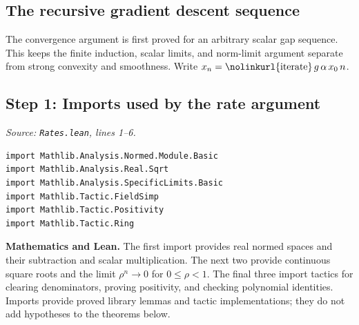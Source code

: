 \documentclass[11pt,a4paper]{article}
\newcommand{\lean}[1]{\ifmmode\text{\nolinkurl{#1}}\else\nolinkurl{#1}\fi}
\newenvironment{proofstep}{%
 \begin{lrbox}{\proofstepbox}\begin{minipage}{\linewidth}%
}{%
 \end{minipage}\end{lrbox}%
 \par\Needspace{\dimexpr\ht\proofstepbox+\dp\proofstepbox+8pt\relax}%
 \noindent\usebox{\proofstepbox}\par\medskip%
}
\begin{document}
\clearpage

\begin{proofstep}

\section{The recursive gradient descent sequence}

The convergence argument is first proved for an arbitrary scalar gap sequence. This keeps the finite induction, scalar limits, and norm-limit argument separate from strong convexity and smoothness. Write $x_n=\lean{iterate}\,g\,\alpha\,x_0\,n$.

\subsection*{Step 1: Imports used by the rate argument}

\textit{Source: \lean{Rates.lean}, lines 1--6.}
\begin{lstlisting}[style=leanproof,firstnumber=1]
import Mathlib.Analysis.Normed.Module.Basic
import Mathlib.Analysis.Real.Sqrt
import Mathlib.Analysis.SpecificLimits.Basic
import Mathlib.Tactic.FieldSimp
import Mathlib.Tactic.Positivity
import Mathlib.Tactic.Ring
\end{lstlisting}


\textbf{Mathematics and Lean.} The first import provides real normed spaces and their subtraction and scalar multiplication. The next two provide continuous square roots and the limit $\rho^n\to0$ for $0\le\rho<1$. The final three import tactics for clearing denominators, proving positivity, and checking polynomial identities. Imports provide proved library lemmas and tactic implementations; they do not add hypotheses to the theorems below.

\end{proofstep}
\end{document}
